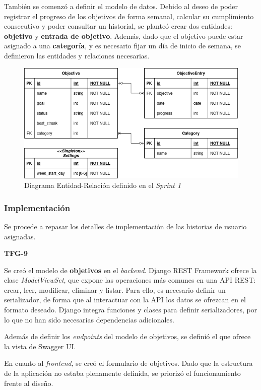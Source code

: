 \documentclass[10pt, a4paper]{aqademic}
\begin{document}
También se comenzó a definir el modelo de datos. Debido al deseo de poder registrar el progreso de los objetivos de forma semanal, calcular su cumplimiento consecutivo y poder consultar un historial, se planteó crear dos entidades: \textbf{objetivo} y \textbf{entrada de objetivo}.
Además, dado que el objetivo puede estar asignado a una \textbf{categoría}, y es necesario fijar un día de inicio de semana, se definieron las entidades y relaciones necesarias.


\begin{figure}[h!]
	\centering
	\includegraphics[scale=0.6]{img/sprint1-modelo-datos.png}
	\caption{Diagrama Entidad-Relación definido en el \textit{Sprint 1}}
\end{figure}

\subsubsection{Implementación}

Se procede a repasar los detalles de implementación de las historias de usuario asignadas.

\textbf{TFG-9}

Se creó el modelo de \textbf{objetivos} en el \textit{backend}. Django REST Framework ofrece la clase \textit{ModelViewSet}, que expone las operaciones más comunes en una API REST: crear, leer, modificar, eliminar y listar. Para ello, es necesario definir un serializador, de forma que al interactuar con la API los datos se ofrezcan en el formato deseado. Django integra funciones y clases para definir serializadores, por lo que no han sido necesarias dependencias adicionales.

Además de definir los \textit{endpoints} del modelo de objetivos, se definió el que ofrece la vista de Swagger UI.


En cuanto al \textit{frontend}, se creó el formulario de objetivos. Dado que la estructura de la aplicación no estaba plenamente definida, se priorizó el funcionamiento frente al diseño. 
\end{document}
